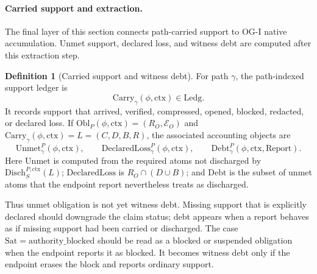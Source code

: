 \documentclass[11pt,twoside]{article}
\theoremstyle{definition}
\newtheorem{definition}[theorem]{Definition}
\newcommand{\Obl}{\mathrm{Obl}}
\newcommand{\Carry}{\mathrm{Carry}}
\newcommand{\Unmet}{\mathrm{Unmet}}
\newcommand{\DeclaredLoss}{\mathrm{DeclaredLoss}}
\newcommand{\Debt}{\mathrm{Debt}}
\newcommand{\Sat}{\mathrm{Sat}}
\newcommand{\Disch}{\mathrm{Disch}}
\newcommand{\Report}{\mathrm{Report}}
\newcommand{\Ledg}{\mathrm{Ledg}}
\newcommand{\ctx}{\mathrm{ctx}}
\newcommand{\authorityblocked}{\mathrm{authority\_blocked}}
\begin{document}
\paragraph{Carried support and extraction.}
The final layer of this section connects path-carried support to OG-I native
accumulation. Unmet support, declared loss, and witness debt are computed after
this extraction step.

\begin{definition}[Carried support and witness debt]
For path $\gamma$, the path-indexed support ledger is
\[
  \Carry_\gamma(\phi,\ctx)\in\Ledg.
\]
It records support that arrived, verified, compressed, opened, blocked,
redacted, or declared loss. If
$\Obl_P(\phi,\ctx)=(R_O,\mathcal E_O)$ and
$\Carry_\gamma(\phi,\ctx)=L=(C,D,B,R)$, the associated accounting objects are
\[
  \Unmet_\gamma^P(\phi,\ctx),\qquad
  \DeclaredLoss_\gamma^P(\phi,\ctx),\qquad
  \Debt_\gamma^P(\phi,\ctx,\Report).
\]
Here $\Unmet$ is computed from the required atoms not discharged by
$\Disch_{S}^{P,\ctx}(L)$; $\DeclaredLoss$ is
$R_O\cap(D\cup B)$; and $\Debt$ is the subset of unmet atoms that the endpoint
report nevertheless treats as discharged.
\end{definition}

Thus unmet obligation is not yet witness debt. Missing support that is
explicitly declared should downgrade the claim status; debt appears when a
report behaves as if missing support had been carried or discharged.
The case $\Sat=\authorityblocked$ should be read as a blocked or suspended
obligation when the endpoint reports it as blocked. It becomes witness debt only
if the endpoint erases the block and reports ordinary support.
\end{document}
